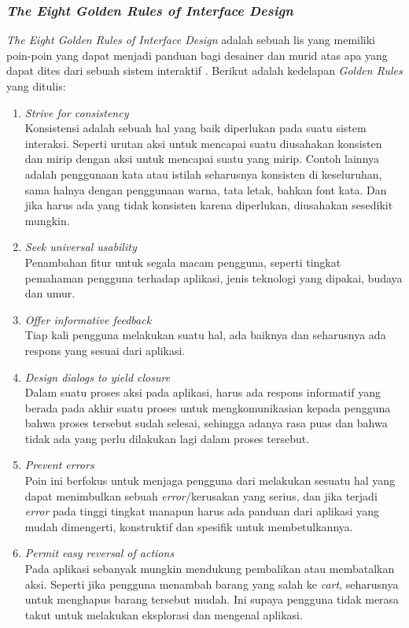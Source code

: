 \documentclass[a4paper]{article}
\newcommand{\subsubbab}[1]{%
    \subsubsection{#1}%
}
\begin{document}
\subsubbab{\textit{The Eight Golden Rules of Interface Design}}
\textit{The Eight Golden Rules of Interface Design} adalah sebuah lis yang memiliki poin-poin yang dapat menjadi panduan bagi desainer dan murid atas apa yang dapat dites dari sebuah sistem interaktif \autocite{Shneiderman_Plaisant_Cohen_Jacobs_Elmqvist_2018_eight_golden_rules}. Berikut adalah kedelapan \textit{Golden Rules} yang ditulis:
\begin{enumerate}
    \item \textit{Strive for consistency}\\
    Konsistensi adalah sebuah hal yang baik diperlukan pada suatu sistem interaksi. Seperti urutan aksi untuk mencapai suatu diusahakan konsisten dan mirip dengan aksi untuk mencapai suatu yang mirip. Contoh lainnya adalah penggunaan kata atau istilah seharusnya konsisten di keseluruhan, sama halnya dengan penggunaan warna, tata letak, bahkan font kata. Dan jika harus ada yang tidak konsisten karena diperlukan, diusahakan sesedikit mungkin.
    \item \textit{Seek universal usability}\\
    Penambahan fitur untuk segala macam pengguna, seperti tingkat pemahaman pengguna terhadap aplikasi, jenis teknologi yang dipakai, budaya dan umur.
    \item \textit{Offer informative feedback}\\
    Tiap kali pengguna melakukan suatu hal, ada baiknya dan seharusnya ada respons yang sesuai dari aplikasi.
    \item \textit{Design dialogs to yield closure}\\
    Dalam suatu proses aksi pada aplikasi, harus ada respons informatif yang berada pada akhir suatu proses untuk mengkomunikasian kepada pengguna bahwa proses tersebut sudah selesai, sehingga adanya rasa puas dan bahwa tidak ada yang perlu dilakukan lagi dalam proses tersebut.
    \item \textit{Prevent errors}\\
    Poin ini berfokus untuk menjaga pengguna dari melakukan sesuatu hal yang dapat menimbulkan sebuah \textit{error}/kerusakan yang serius, dan jika terjadi \textit{error} pada tinggi tingkat manapun harus ada panduan dari aplikasi yang mudah dimengerti, konstruktif dan spesifik untuk membetulkannya.
    \item \textit{Permit easy reversal of actions}\\
    Pada aplikasi sebanyak mungkin mendukung pembalikan atau membatalkan aksi. Seperti jika pengguna menambah barang yang salah ke \textit{cart}, seharusnya untuk menghapus barang tersebut mudah. Ini supaya pengguna tidak merasa takut untuk melakukan eksplorasi dan mengenal aplikasi.

\end{enumerate}
\end{document}

